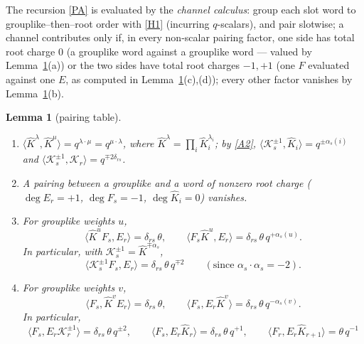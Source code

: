 \documentclass[11pt]{article}
\newtheorem{lemma}[theorem]{Lemma}
\theoremstyle{definition}
\theoremstyle{remark}
\newcommand{\la}{\langle}
\newcommand{\ra}{\rangle}
\newcommand{\del}{\delta}
\newcommand{\hK}{\hat K}
\newcommand{\cK}{\mathcal K}
\newcommand{\tht}{\theta}
\begin{document}
The recursion \eqref{PA} is evaluated by the \emph{channel calculus}:
group each slot word to grouplike--then--root order with \eqref{H1}
(incurring $q$-scalars), and pair slotwise; a channel
contributes only if, in every non-scalar pairing factor, one side has
total root charge $0$ (a grouplike word against a grouplike word —
valued by Lemma~\ref{lem:T}(a)) or the two sides have total root
charges $-1,+1$ (one $F$ evaluated against one $E$, as computed in
Lemma~\ref{lem:T}(c),(d)); every other factor vanishes by
Lemma~\ref{lem:T}(b).

\begin{lemma}[pairing table]\label{lem:T}
\begin{enumerate}[label=(\alph*),leftmargin=2.2em]
\item\label{Ta} $\la\hK^\lambda,\hK^\mu\ra=q^{\lambda\cdot\mu}
  =q^{\mu\cdot\lambda}$, where $\hK^\lambda=\prod_i\hK_i^{\lambda_i}$;
  by \eqref{A2}, $\la\cK_s^{\pm1},\hK_i\ra=q^{\pm\alpha_s(i)}$ and
  $\la\cK_s^{\pm1},\cK_r\ra=q^{\mp2\del_{rs}}$.
\item\label{Tb} A pairing between a grouplike and a word of nonzero
  root charge ($\deg E_r=+1$, $\deg F_s=-1$, $\deg\hK_i=0$) vanishes.
\item\label{Tc} For grouplike weights $u$,
  \[
  \la\hK^{u}F_s,E_r\ra=\del_{rs}\,\tht,\qquad
  \la F_s\hK^{u},E_r\ra=\del_{rs}\,\tht\,q^{+\alpha_s(u)} .
  \]
  In particular, with $\cK_s^{\pm1}=\hK^{\mp\alpha_s}$,
  \[
  \la\cK_s^{\pm1}F_s,E_r\ra=\del_{rs}\,\tht\,q^{\mp2}\qquad
  (\text{since }\alpha_s\cdot\alpha_s=-2).
  \]
\item\label{Td} For grouplike weights $v$,
  \[
  \la F_s,\hK^{v}E_r\ra=\del_{rs}\,\tht,\qquad
  \la F_s,E_r\hK^{v}\ra=\del_{rs}\,\tht\,q^{-\alpha_s(v)} .
  \]
  In particular,
  \[
  \la F_s,E_r\cK_r^{\pm1}\ra=\del_{rs}\,\tht\,q^{\pm2},\qquad
  \la F_s,E_r\hK_r\ra=\del_{rs}\,\tht\,q^{+1},\qquad
  \la F_r,E_r\hK_{r+1}\ra=\tht\,q^{-1}
  \]
\end{enumerate}
\end{lemma}
\end{document}
